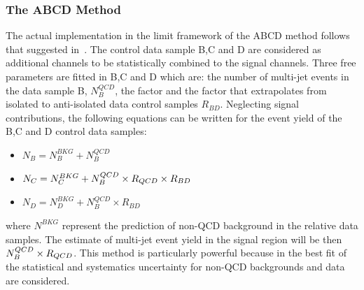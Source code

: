 \subsubsection{The ABCD Method}
The actual implementation in the limit framework of the ABCD method follows that suggested in~\cite{ABCD}.
The control data sample B,C and D are considered as additional channels to be statistically combined
to the signal channels. Three free parameters are fitted in B,C and D which are: the 
number of multi-jet events in the data sample B, $N_{B}^{QCD}$, the factor \rqcd 
and the factor that extrapolates from isolated to anti-isolated data control samples $R_{BD}$. Neglecting signal contributions, 
the following equations can be written for the event yield of the B,C and D control data samples:
\begin{itemize}
\item[] $N_{B} = N_{B}^{BKG} + N_{B}^{QCD}$
\item[] $N_{C} = N_{C}^{BKG} +  N_{B}^{QCD} \times R_{QCD} \times R_{BD} $
\item[] $N_{D} =  N_{D}^{BKG} + N_{B}^{QCD} \times  R_{BD} $
\end{itemize}
where $N^{BKG}$ represent the prediction of  non-QCD background in the relative data samples.
The estimate of multi-jet event yield in the signal region will be then $ N_{B}^{QCD} \times R_{QCD} $. This method is 
particularly powerful because in the best fit of \rqcd the statistical 
and systematics uncertainty for non-QCD backgrounds and data are considered.


